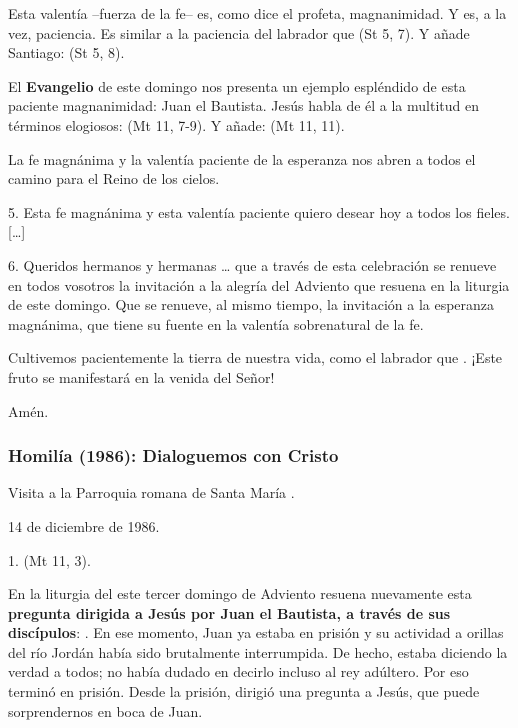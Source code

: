 Esta valentía --fuerza de la fe-- es, como dice el profeta, magnanimidad. Y es, a la vez, paciencia. Es similar a la paciencia del labrador que  (St 5, 7). Y añade Santiago:  (St 5, 8).

El \textbf{Evangelio} de este domingo nos presenta un ejemplo espléndido de esta paciente magnanimidad: Juan el Bautista. Jesús habla de él a la multitud en términos elogiosos:  (Mt 11, 7-9). Y añade:  (Mt 11, 11).

La fe magnánima y la valentía paciente de la esperanza nos abren a todos el camino para el Reino de los cielos.

5. Esta fe magnánima y esta valentía paciente quiero desear hoy a todos los fieles. {[}\ldots{}{]}

6. Queridos hermanos y hermanas \ldots{} que a través de esta celebración se renueve en todos vosotros la invitación a la alegría del Adviento que resuena en la liturgia de este domingo. Que se renueve, al mismo tiempo, la invitación a la esperanza magnánima, que tiene su fuente en la valentía sobrenatural de la fe.

Cultivemos pacientemente la tierra de nuestra vida, como el labrador que . ¡Este fruto se manifestará en la venida del Señor!

Amén.

\subsubsection{Homilía (1986): Dialoguemos con Cristo}

Visita a la Parroquia romana de Santa María .

14 de diciembre de 1986.

1.  (Mt 11, 3).

En la liturgia del este tercer domingo de Adviento resuena nuevamente esta \textbf{pregunta dirigida a Jesús por Juan el Bautista, a través de sus discípulos}: . En ese momento, Juan ya estaba en prisión y su actividad a orillas del río Jordán había sido brutalmente interrumpida. De hecho, estaba diciendo la verdad a todos; no había dudado en decirlo incluso al rey adúltero. Por eso terminó en prisión. Desde la prisión, dirigió una pregunta a Jesús, que puede sorprendernos en boca de Juan.

